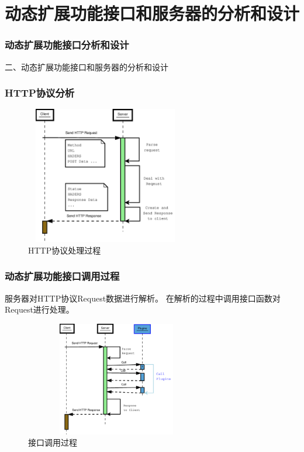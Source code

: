 \documentclass[10pt,dvipdfm]{beamer}
\begin{document}
\section{动态扩展功能接口和服务器的分析和设计}



\begin{frame}
	\frametitle{动态扩展功能接口分析和设计}
	\begin{center}
	{\Large
		二、动态扩展功能接口和服务器的分析和设计
	}
	\end{center}
\end{frame}


\begin{frame}
	\frametitle{HTTP协议分析}
	\begin{figure}[htbp]
	\centering
	\includegraphics[height=6cm, width=7cm]{pics/serverhttp.eps}
	\caption{HTTP协议处理过程}
	\end{figure}
\end{frame}

\begin{frame}
	\frametitle{动态扩展功能接口调用过程}
	服务器对HTTP协议Request数据进行解析。	在解析的过程中调用接口函数对Request进行处理。

	\begin{figure}[htbp]
	\centering
	\includegraphics[height=5cm, width=8cm]{pics/httpplugin.eps}
	\caption{接口调用过程}
	\end{figure}

\end{frame}
\end{document}
